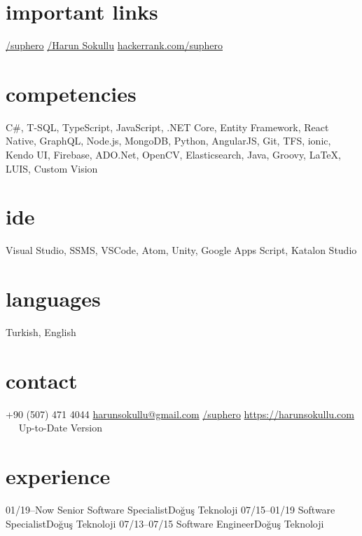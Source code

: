 \documentclass[]{friggeri-cv} %
\begin{document}

\begin{aside}
\section{important links}
\href{https://github.com/suphero}{\faGithub/suphero}
\href{https://play.google.com/store/apps/developer?id=Harun+Sokullu}{\faAndroid/Harun Sokullu}
\href{https://www.hackerrank.com/suphero}{hackerrank.com/suphero}
\section{competencies}
C\#, T-SQL, TypeScript, JavaScript, .NET Core, Entity Framework, React Native, GraphQL, Node.js, MongoDB, Python, AngularJS, Git, TFS, ionic, Kendo UI, Firebase, ADO.Net, OpenCV, Elasticsearch, Java, Groovy, \LaTeX, LUIS, Custom Vision
\section{ide}
Visual Studio, SSMS, VSCode, Atom, Unity, Google Apps Script, Katalon Studio
\section{languages}
Turkish, English
\section{contact}
+90 (507) 471 4044
\href{mailto:harunsokullu@gmail.com}{harunsokullu@gmail.com}
\href{https://www.linkedin.com/in/suphero}{\faLinkedin/suphero}
\href{https://harunsokullu.com}{https://harunsokullu.com}
~~
Up-to-Date Version
\end{aside}

\section{experience}

\begin{entrylist}

\entry
{01/19--Now}
{Senior Software Specialist}{Doğuş Teknoloji}{}
\entry
{07/15--01/19}
{Software Specialist}{Doğuş Teknoloji}{}
\entry
{07/13--07/15}
{Software Engineer}{Doğuş Teknoloji}{}

\end{entrylist}
\end{document}
